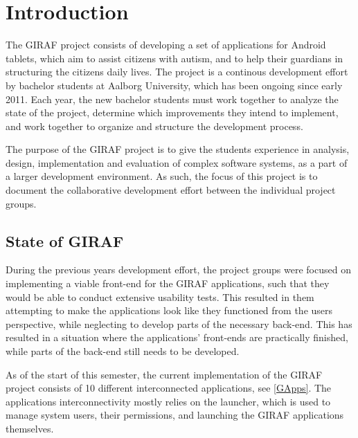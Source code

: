 \chapter{Introduction}
The GIRAF project consists of developing a set of applications for Android
tablets, which aim to assist citizens with autism, and to help their guardians in 
structuring the citizens daily lives. The project is a continous development
effort by bachelor students at Aalborg University, which has been
ongoing since early 2011. Each year, the new bachelor students must work
together to analyze the state of the project, determine which improvements
they intend to implement, and work together to organize and structure the
development process.\nl

The purpose of the GIRAF project is to give the students experience in analysis,
design, implementation and evaluation of complex software systems, as a part of
a larger development environment. As such, the focus of this project is to
document the collaborative development effort between the individual project
groups.


\section{State of GIRAF}
During the previous years development effort, the project groups were focused
on implementing a viable front-end for the GIRAF applications, such that they
would be able to conduct extensive usability tests. This resulted in them
attempting to make the applications look like they functioned from the users
perspective, while neglecting to develop parts of the necessary back-end.
This has resulted in a situation where the applications' front-ends are
practically finished, while parts of the back-end still needs to be
developed.\nl

As of the start of this semester, the current implementation of the GIRAF
project consists of 10 different interconnected applications, see
\autoref{GApps}. The applications interconnectivity mostly relies on the
launcher, which is used to manage system users, their permissions, and
launching the GIRAF applications themselves.

